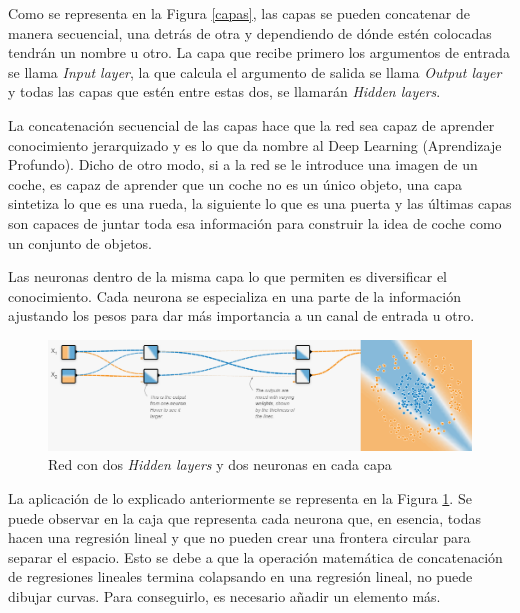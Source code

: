 \begin{itemize}
    Como se representa en la Figura \ref{capas}, las capas se pueden concatenar de manera secuencial, una detrás de otra y dependiendo de dónde estén colocadas tendrán un nombre u otro. La capa que recibe primero los argumentos de entrada se llama \textit{Input layer}, la que calcula el argumento de salida se llama \textit{Output layer} y todas las capas que estén entre estas dos, se llamarán \textit{Hidden layers}. 
    
    La concatenación secuencial de las capas hace que la red sea capaz de aprender conocimiento jerarquizado y es lo que da nombre al Deep Learning (Aprendizaje Profundo). Dicho de otro modo, si a la red se le introduce una imagen de un coche, es capaz de aprender que un coche no es un único objeto, una capa sintetiza lo que es una rueda, la siguiente lo que es una puerta y las últimas capas son capaces de juntar toda esa información para construir la idea de coche como un conjunto de objetos.
    
    Las neuronas dentro de la misma capa lo que permiten es diversificar el conocimiento. Cada neurona se especializa en una parte de la información ajustando los pesos para dar más importancia a un canal de entrada u otro.
    
    \begin{figure}[h!]
        \centering
        \includegraphics[width=135mm, angle=0]{2/Fotos/capas.png}
        \captionsetup{justification=centering,margin=1.25cm}
        \caption{Red con dos \textit{Hidden layers} y dos neuronas en cada capa}
        \label{aplicacion_capas}
    \end{figure}
    
    La aplicación de lo explicado anteriormente se representa en la Figura \ref{aplicacion_capas}. Se puede observar en la caja que representa cada neurona que, en esencia, todas hacen una regresión lineal y que no pueden crear una frontera circular para separar el espacio. Esto se debe a que la operación matemática de concatenación de regresiones lineales termina colapsando en una regresión lineal, no puede dibujar curvas. Para conseguirlo, es necesario añadir un elemento más. 
    


\end{itemize}
